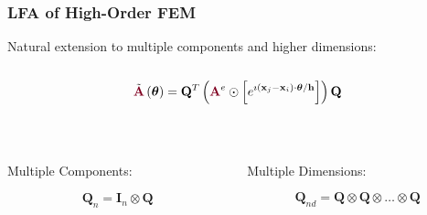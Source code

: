 \documentclass{beamer}
\begin{document}
\begin{frame}
\begin{center}
\frametitle{LFA of High-Order FEM}

Natural extension to multiple components and higher dimensions:\\

~\\

\begin{equation}
\tilde{{\color{burgundy}\mathbf{A}}} \left( \boldsymbol{\theta} \right) = \mathbf{Q}^T \left( {\color{burgundy}\mathbf{A}}^e \odot \left[ e^{\imath \left( \mathbf{x}_j - \mathbf{x}_i \right) \cdot \boldsymbol{\theta} / \mathbf{h}} \right] \right) \mathbf{Q}
\label{eq:symbolhighorder}
\end{equation}

~\\

\begin{columns}[onlytextwidth]
  \begin{column}{0.45\textwidth}
    \begin{center}
    Multiple Components:
    \end{center}
    \begin{equation}
    \mathbf{Q}_n = \mathbf{I}_n \otimes \mathbf{Q}
    \end{equation}
  \end{column}

  \begin{column}{0.45\textwidth}
    \begin{center}
    Multiple Dimensions:
    \end{center}
    \begin{equation}
    \mathbf{Q}_{nd} = \mathbf{Q} \otimes \mathbf{Q} \otimes \dots \otimes \mathbf{Q}
    \end{equation}
  \end{column}
\end{columns}

\end{center}
\end{frame}

\end{document}
